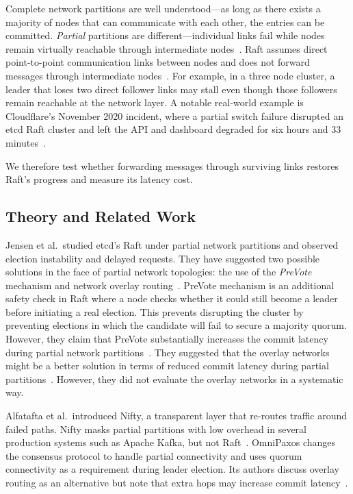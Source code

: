 \documentclass[11pt,a4paper]{article}
\begin{document}
Complete network partitions are well understood---as long as there exists a majority of nodes that can communicate with each other, the entries can be committed.
\emph{Partial} partitions are different---individual links fail while nodes remain virtually reachable through intermediate nodes~\cite[Sec.~2]{alfatafta2020nifty}.
Raft assumes direct point-to-point communication links between nodes and does not forward messages through intermediate nodes~\cite[Secs.~5.1--5.3]{ongaro2014raft}.
For example, in a three node cluster, a leader that loses two direct follower links may stall even though those followers remain reachable at the network layer.
A notable real-world example is Cloudflare's November 2020 incident, where a partial switch failure disrupted an etcd Raft cluster and left the API and dashboard degraded for six hours and 33 minutes~\cite{cloudflare2020byzantine}.

We therefore test whether forwarding messages through surviving links restores Raft's progress and measure its latency cost.

\subsection{Theory and Related Work}

Jensen et al.\ studied etcd's Raft under partial network partitions and observed election instability and delayed requests.
They have suggested two possible solutions in the face of partial network topologies: the use of the \emph{PreVote} mechanism and network overlay routing~\cite[Sec.~5]{jensen2021raft}.
PreVote mechanism is an additional safety check in Raft where a node checks whether it could still become a leader before initiating a real election.
This prevents disrupting the cluster by preventing elections in which the candidate will fail to secure a majority quorum. 
However, they claim that PreVote substantially increases the commit latency during partial network partitions~\cite[Sec.~5]{jensen2021raft}.
They suggested that the overlay networks might be a better solution in terms of reduced commit latency during partial partitions~\cite[Secs.~4--5]{jensen2021raft}.
However, they did not evaluate the overlay networks in a systematic way.

Alfatafta et al.\ introduced Nifty, a transparent layer that re-routes traffic around failed paths.
Nifty masks partial partitions with low overhead in several production systems such as Apache Kafka, but not Raft~\cite[Secs.~6--7]{alfatafta2020nifty}.
OmniPaxos changes the consensus protocol to handle partial connectivity and uses quorum connectivity as a requirement during leader election.
Its authors discuss overlay routing as an alternative but note that extra hops may increase commit latency~\cite[Secs.~2,8]{ng2023omnipaxos}.
\end{document}
